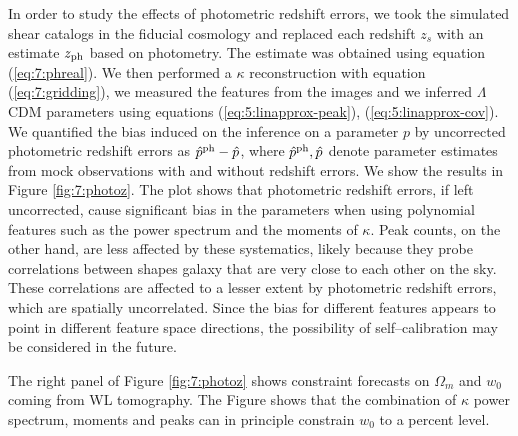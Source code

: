 In order to study the effects of photometric redshift errors, we took the simulated shear catalogs in the fiducial cosmology and replaced each redshift $z_s$ with an estimate $z_{\rm ph}$ based on photometry. The estimate was obtained using equation (\ref{eq:7:phreal}). We then performed a $\kappa$ reconstruction with equation (\ref{eq:7:gridding}), we measured the features from the images and we inferred $\Lambda$CDM parameters using equations (\ref{eq:5:linapprox-peak}), (\ref{eq:5:linapprox-cov}). We quantified the bias induced on the inference on a parameter $p$ by uncorrected photometric redshift errors as $\hat{p}^{\rm ph}-\hat{p}$, where $\hat{p}^{\rm ph},\hat{p}$ denote parameter estimates from mock observations with and without redshift errors. We show the results in Figure \ref{fig:7:photoz}. The plot shows that photometric redshift errors, if left uncorrected, cause significant bias in the parameters when using polynomial features such as the power spectrum and the moments of $\kappa$. Peak counts, on the other hand, are less affected by these systematics, likely because they probe correlations between shapes galaxy that are very close to each other on the sky. These correlations are affected to a lesser extent by photometric redshift errors, which are spatially uncorrelated. Since the bias for different features appears to point in different feature space directions, the possibility of self--calibration may be considered in the future.

The right panel of Figure \ref{fig:7:photoz} shows constraint forecasts on $\Omega_m$ and $w_0$ coming from WL tomography. The Figure shows that the combination of $\kappa$ power spectrum, moments and peaks can in principle constrain $w_0$ to a percent level.   

